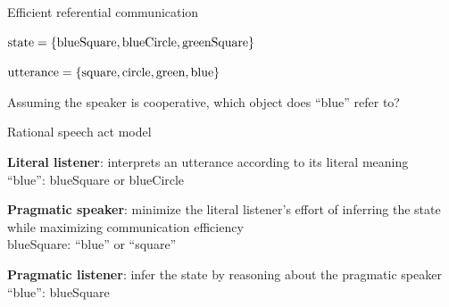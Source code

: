 \documentclass[usenames,dvipsnames,notes]{beamer}
\begin{document}
\begin{frame}
    {Efficient referential communication}
    \begin{center}
    \end{center}

    $\text{state} = \left\{  \text{blueSquare}, \text{blueCircle}, \text{greenSquare}  \right\}$

    $\text{utterance} = \left\{ \text{square}, \text{circle}, \text{green}, \text{blue} \right\}$

    Assuming the speaker is cooperative, which object does ``blue'' refer to?
\end{frame}

\begin{frame}
    {Rational speech act model}
    \begin{center}
    \end{center}
    \textbf{Literal listener}: interprets an utterance according to its literal meaning\\
    \hspace{2em} ``blue'': blueSquare or blueCircle

    \textbf{Pragmatic speaker}: minimize the literal listener's effort of inferring the state while maximizing communication efficiency\\
    \hspace{2em} blueSquare: ``blue'' or ``square''

    \textbf{Pragmatic listener}: infer the state by reasoning about the pragmatic speaker\\
    \hspace{2em} ``blue'': blueSquare
\end{frame}
\end{document}
